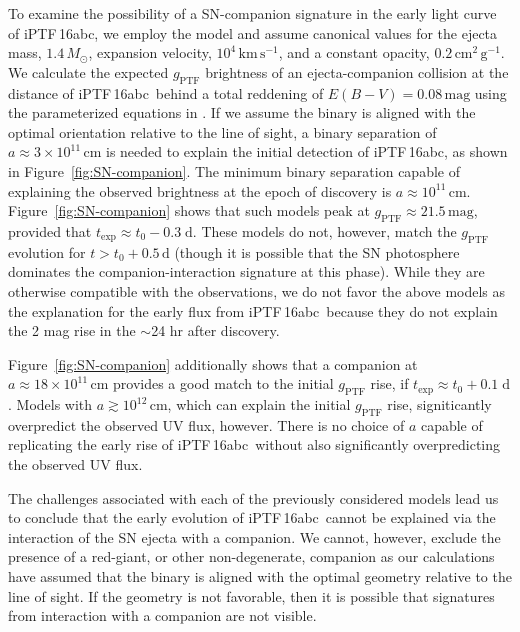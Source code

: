 \documentclass[twocolumn]{aastex61}
\newcommand{\sm}{M_\odot}
\newcommand{\abc}{iPTF\,16abc}
\begin{document}
To examine the possibility of a SN-companion signature in the early
light curve of \abc, we employ the \citet{2010ApJ...708.1025K}
model and assume canonical values for the ejecta mass, $1.4\,\sm$, expansion velocity, $10^{4}\,\textrm{km}\,\textrm{s}^{-1}$, and a constant opacity, $0.2\,\textrm{cm}^2\,\textrm{g}^{-1}$. We calculate the expected $g_\mathrm{PTF}$ brightness of an ejecta-companion collision at the distance of \abc\ behind a total reddening of $E(B-V) = 0.08 \, \mathrm{mag}$ using the parameterized equations in \citet{2012ApJ...749...18B}. If we assume the binary is aligned with the optimal orientation relative to the line of sight, a binary separation of $a \approx 3 \times 10^{11}\, \mathrm{cm}$ is needed to explain the initial detection of \abc, as shown in Figure~\ref{fig:SN-companion}.  The minimum binary separation capable of explaining the observed brightness at the epoch of discovery is $a \approx 10^{11} \, \mathrm{cm}$. Figure~\ref{fig:SN-companion} shows that such models peak at $g_\mathrm{PTF} \approx 21.5 \, \mathrm{mag}$, provided that $t_\mathrm{exp} \approx t_0 - 0.3 \; \mathrm{d}$. These models do not, however, match the $g_\mathrm{PTF}$ evolution for $t > t_0 + 0.5 \, \mathrm{d}$ (though it is possible that the SN photosphere dominates the companion-interaction signature at this phase). While they are otherwise compatible with the observations, we do not favor the above models as the explanation for the early flux from \abc\ because they do not explain the 2 mag rise in the $\sim$24 hr after discovery.

Figure~\ref{fig:SN-companion} additionally shows that a companion at $a \approx 18 \times 10^{11} \, \mathrm{cm}$ provides a good match to the initial $g_\mathrm{PTF}$ rise, if $t_\mathrm{exp} \approx t_0 + 0.1 \; \mathrm{d}$. Models with $a \gtrsim 10^{12} \, \mathrm{cm}$, which can explain the initial $g_\mathrm{PTF}$ rise, signiticantly overpredict the observed UV flux, however. There is no choice of $a$ capable of replicating the early rise of \abc\ without also significantly overpredicting the observed UV flux.

The challenges associated with each of the previously considered models lead us to conclude that the early evolution of \abc\ cannot be explained via the interaction of the SN ejecta with a companion. We cannot, however, exclude the presence of a red-giant, or other non-degenerate, companion as our calculations have assumed that the binary is aligned with the optimal geometry relative to the line of sight. If the geometry is not favorable, then it is possible that signatures from interaction with a companion are not visible. 
\end{document}
